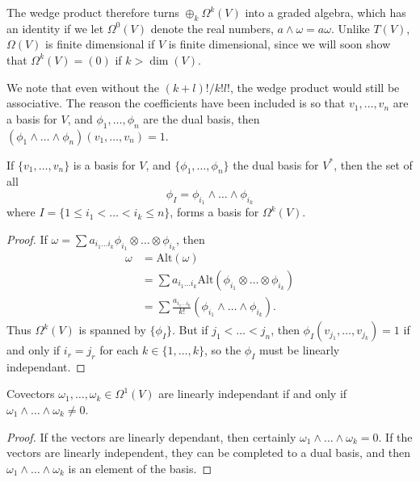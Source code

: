 The wedge product therefore turns $\oplus_k \Omega^k(V)$ into a graded algebra, which has an identity if we let $\Omega^0(V)$ denote the real numbers, $a \wedge \omega = a \omega$. Unlike $T(V)$, $\Omega(V)$ is finite dimensional if $V$ is finite dimensional, since we will soon show that $\Omega^k(V) = (0)$ if $k > \dim(V)$.

\begin{remark}
    We note that even without the $(k+l)! / k! l!$, the wedge product would still be associative. The reason the coefficients have been included is so that $v_1, \dots, v_n$ are a basis for $V$, and $\phi_1, \dots, \phi_n$ are the dual basis, then $(\phi_1 \wedge \dots \wedge \phi_n)(v_1, \dots, v_n) = 1$.
\end{remark}

\begin{theorem}
    If $\{ v_1, \dots, v_n \}$ is a basis for $V$, and $\{ \phi_1, \dots, \phi_n \}$ the dual basis for $V^*$, then the set of all
    \[ \phi_I = \phi_{i_1} \wedge \dots \wedge \phi_{i_k} \]
    where $I = \{ 1 \leq i_1 < \dots < i_k \leq n \}$, forms a basis for $\Omega^k(V)$.
\end{theorem}
\begin{proof}
    If $\omega = \sum a_{i_1 \dots i_k} \phi_{i_1} \otimes \dots \otimes \phi_{i_k}$, then
    \begin{align*}
        \omega &= \text{Alt}(\omega)\\
        &= \sum a_{i_1 \dots i_k} \text{Alt}(\phi_{i_1} \otimes \dots \otimes \phi_{i_k})\\
        &= \sum \frac{a_{i_1 \dots i_k}}{k!} (\phi_{i_1} \wedge \dots \wedge \phi_{i_k}).
    \end{align*}
    Thus $\Omega^k(V)$ is spanned by $\{ \phi_I \}$. But if $j_1 < \dots < j_n$, then $\phi_I(v_{j_1}, \dots, v_{j_k}) = 1$ if and only if $i_r = j_r$ for each $k \in \{ 1, \dots, k \}$, so the $\phi_I$ must be linearly independant.
\end{proof}

\begin{corollary}
    Covectors $\omega_1, \dots, \omega_k \in \Omega^1(V)$ are linearly independant if and only if $\omega_1 \wedge \dots \wedge \omega_k \neq 0$.
\end{corollary}
\begin{proof}
    If the vectors are linearly dependant, then certainly $\omega_1 \wedge \dots \wedge \omega_k = 0$. If the vectors are linearly independent, they can be completed to a dual basis, and then $\omega_1 \wedge \dots \wedge \omega_k$ is an element of the basis.
\end{proof}

